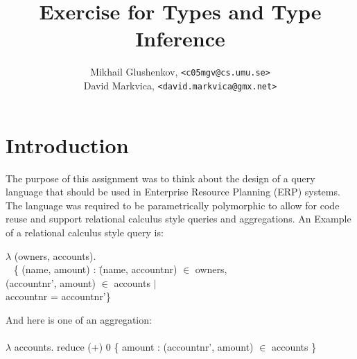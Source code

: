\documentclass[10pt, oneside]{article}
\author{Mikhail Glushenkov, \texttt{<c05mgv@cs.umu.se>} \\
        David Markvica, \texttt{<david.markvica@gmx.net>}}
\title{Exercise for Types and Type Inference}
\begin{document}
\pagestyle{headings}

\pagebreak

\setlength{\parindent}{0pt}
\setlength{\parskip}{10pt}

\section {Introduction}

The purpose of this assignment was to think about the design of a query language that should be used in Enterprise Resource Planning (ERP) systems. The language was required to be parametrically polymorphic to allow for code reuse and support relational calculus style queries and aggregations.
An Example of a relational calculus style query is:
\begin{tabbing}
$\lambda$ (owners, accounts).\\
~ \{ (name, amount) : \= (name, accountnr) $\in$ owners,\\
\> (accountnr', amount) $\in$ accounts $|$\\
\> accountnr = accountnr'\}
\end{tabbing}


And here is one of an aggregation:\\
\\
$\lambda$ accounts. reduce (+) 0 \{ amount : (accountnr', amount) $\in$ accounts \}
\end{document}
